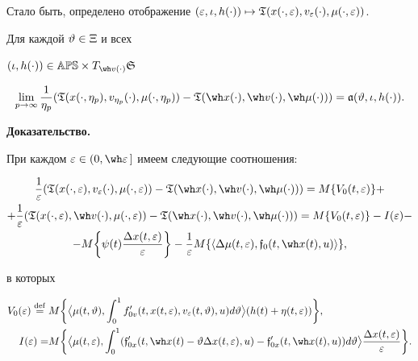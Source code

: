 Стало быть, определено отображение $(\ve,\iota,h(\cdot))\mapsto


\gT(x(\cdot,\ve),v_{\ve}(\cdot),\mu(\cdot,\ve))$.





\begin{lems}


Для каждой $\vartheta\in\Xi$ и всех


$(\iota,h(\cdot))\in\Bbb{APS}\times T_{\wh v(\cdot)}\gS$


$$


\lim_{p\to\infty}\frac{1}{\eta_{p}}


(\gT(x(\cdot,\eta_{p}),v_{\eta_{p}}(\cdot),\mu(\cdot,\eta_{p}))-


\gT(\wh x(\cdot),\wh v(\cdot),\wh \mu(\cdot)))=\frak a(\vt,\iota,h(\cdot)).


$$


\end{lems}





{\bf Доказательство.}


При каждом $\ve\in(0,\wh\ve\,]$ имеем следующие соотношения:


\begin{multline*}


\frac{1}{\ve}(\gT(x(\cdot,\ve),v_{\ve}(\cdot),\mu(\cdot,\ve))-


\gT(\wh x(\cdot),\wh v(\cdot),\wh \mu(\cdot)))=M\{V_{0}(t,\ve)\}+ \\


%


+\frac{1}{\ve}(\gT(x(\cdot,\ve),\wh v(\cdot),\mu(\cdot,\ve))-


\gT(\wh x(\cdot),\wh v(\cdot),\wh \mu(\cdot)))=M\{V_{0}(t,\ve)\}-I(\ve)-\\


%


-M\bigg\{\psi(t)\frac{\Dl x(t,\ve)}{\ve}\bigg\}-\frac{1}{\ve}


M\{\la\Dl\mu(t,\ve),\frak{f}_{0}(t,\wh x(t),u)\ra\},


\end{multline*}


в которых


\begin{align*}


V_{0}(\ve)\overset{\mathrm{def}}{=}{}&M\bigg\{\big\la\mu(t,\vt),


\int_{0}^{1}f'_{0v}(t,x(t,\ve),v_{\ve}(t,\vt),u)d\vt\big\ra


(h(t)+\eta(t,\ve))\bigg\}, \\


%


I(\ve)= &M\bigg\{\big\la\mu(t,\ve),\int_{0}^{1}


({\frak{f}}'_{0x}(t,\wh x(t)-\vt\Dl x(t,\ve),u)-


{\frak{f}}'_{0x}(t,\wh x(t),u))d\vt\big\ra\frac{\Dl x(t,\ve)}{\ve}\bigg\}.


\end{align*}


